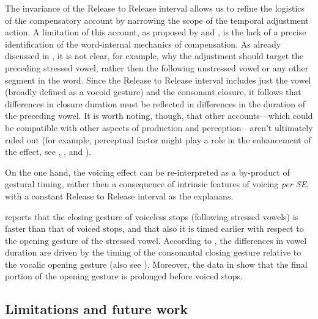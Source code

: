 \documentclass[12pt,]{article}
\begin{document}
The invariance of the Release to Release interval allows us to refine
the logistics of the compensatory account by narrowing the scope of the
temporal adjustment action. A limitation of this account, as proposed by
\citet{slis1969} and \citet{lehiste1970}, is the lack of a precise
identification of the word-internal mechanics of compensation. As
already discussed in , it is not clear, for example, why
the adjustment should target the preceding stressed vowel, rather then
the following unstressed vowel or any other segment in the word. Since
the Release to Release interval includes just the vowel (broadly defined
as a vocoid gesture) and the consonant closure, it follows that
differences in closure duration must be reflected in differences in the
duration of the preceding vowel. It is worth noting, though, that other
accounts---which could be compatible with other aspects of production
and perception---aren't ultimately ruled out (for example, perceptual
factor might play a role in the enhancement of the effect, see
\citealt{kingston1994}, \citealt{port1982}, and \citealt{luce1985}).

On the one hand, the voicing effect can be re-interpreted as a
by-product of gestural timing, rather then a consequence of intrinsic
features of voicing \emph{per SE}, with a constant Release to Release
interval as the explanans.

\citet{de-jong1991} reports that the closing gesture of voiceless stops
(following stressed vowels) is faster than that of voiced stops, and
that also it is timed earlier with respect to the opening gesture of the
stressed vowel. According to \citet{de-jong1991}, the differences in
vowel duration are driven by the timing of the consonantal closing
gesture relative to the vocalic opening gesture (also see
\citealt{hertrich1997}). Moreover, the data in \citet{de-jong1991} show
that the final portion of the opening gesture is prolonged before voiced
stops.

\hypertarget{limitations-and-future-work}{%
\subsection{Limitations and future
work}\label{limitations-and-future-work}}
\end{document}
